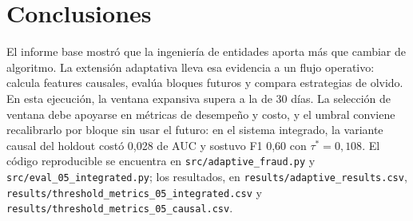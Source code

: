 \documentclass[11pt,a4paper]{article}
\begin{document}
\section{Conclusiones}

\begin{sloppypar}
El informe base mostró que la ingeniería de entidades aporta más que cambiar de algoritmo. La extensión
adaptativa lleva esa evidencia a un flujo operativo: calcula features causales, evalúa bloques futuros y
compara estrategias de olvido. En esta ejecución, la ventana expansiva supera a la de 30 días. La
selección de ventana debe apoyarse en métricas de desempeño y costo, y el umbral conviene recalibrarlo
por bloque sin usar el futuro: en el sistema integrado, la variante causal del holdout costó 0,028 de
AUC y sostuvo F1 0,60 con $\tau^{*}=0{,}108$. El código reproducible se encuentra en
\texttt{src/adaptive\_fraud.py} y \texttt{src/eval\_05\_integrated.py}; los resultados, en
\texttt{results/adaptive\_results.csv}, \texttt{results/threshold\_metrics\_05\_integrated.csv} y
\texttt{results/threshold\_metrics\_05\_causal.csv}.
\end{sloppypar}
\end{document}
